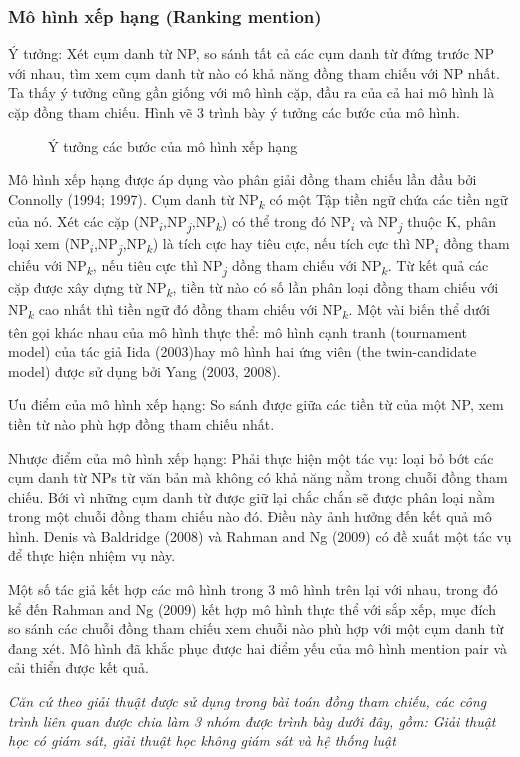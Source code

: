 \documentclass[12pt]{extarticle}
\begin{document}
			\subsubsection*{Mô hình xếp hạng (Ranking mention)}
				\par Ý tưởng: Xét cụm danh từ NP, so sánh tất cả các cụm danh từ đứng trước NP với nhau, tìm xem cụm danh từ nào có khả năng đồng tham chiếu với NP nhất. Ta thấy ý tưởng cũng gần giống với mô hình cặp, đầu ra của cả hai mô hình là cặp đồng tham chiếu. Hình vẽ 3 trình bày ý tưởng các bước của mô hình.
				\begin{figure}[H]
					\centering
					
					\caption{Ý tưởng các bước của mô hình xếp hạng}
				\end{figure}
				\par Mô hình xếp hạng được áp dụng vào phân giải đồng tham chiếu lần đầu bởi Connolly (1994; 1997)\cite{connolly95}\cite{connolly97}. Cụm danh từ NP\textsubscript{$k$} có một Tập tiền ngữ chứa các tiền ngữ của nó. Xét các cặp (NP\textsubscript{$i$},NP\textsubscript{$j$},NP\textsubscript{$k$}) có thể trong đó NP\textsubscript{$i$} và NP\textsubscript{$j$} thuộc K, phân loại xem (NP\textsubscript{$i$},NP\textsubscript{$j$},NP\textsubscript{$k$}) là tích cực hay tiêu cực, nếu tích cực thì NP\textsubscript{$i$} đồng tham chiếu với NP\textsubscript{$k$}, nếu tiêu cực thì NP\textsubscript{$j$} dồng tham chiếu với NP\textsubscript{$k$}. Từ kết quả các cặp được xây dựng từ NP\textsubscript{$k$}, tiền từ nào có số lần phân loại đồng tham chiếu với NP\textsubscript{$k$} cao nhất thì tiền ngữ đó đồng tham chiếu với NP\textsubscript{$k$}.
				Một vài biến thể dưới tên gọi khác nhau của mô hình thực thể: mô hình cạnh tranh (tournament model) của tác giả Iida (2003)\cite{iida03}hay mô hình hai ứng viên (the twin-candidate model) được sử dụng bởi Yang (2003, 2008)\cite{yang03}\cite{yang08}. 
				\par Ưu điểm của mô hình xếp hạng: So sánh được giữa các tiền từ của một NP, xem tiền từ nào phù hợp đồng tham chiếu nhất.
				\par Nhược điểm của mô hình xếp hạng: Phải thực hiện một tác vụ: loại bỏ bớt các cụm danh từ NPs từ văn bản mà không có khả năng nằm trong chuỗi đồng tham chiếu. Bới vì những cụm danh từ được giữ lại chắc chắn sẽ được phân loại nằm trong một chuỗi đồng tham chiếu nào đó. Điều này ảnh hưởng đến kết quả mô hình. Denis và Baldridge (2008)\cite{denis08} và Rahman and Ng (2009)\cite{rahman09} có đề xuất một tác vụ để thực hiện nhiệm vụ này.					
				\par Một số tác giả kết hợp các mô hình trong 3 mô hình trên lại với nhau, trong đó kể đến Rahman and Ng (2009)\cite{rahman09} kết hợp mô hình thực thể với sắp xếp, mục đích so sánh các chuỗi đồng tham chiếu xem chuỗi nào phù hợp với một cụm danh từ đang xét. Mô hình đã khắc phục được hai điểm yếu của mô hình mention pair và cải thiển được kết quả.
			\par \textit{Căn cứ theo giải thuật được sử dụng trong bài toán đồng tham chiếu, các công trình liên quan được chia làm 3 nhóm được trình bày dưới đây, gồm: Giải thuật học có giám sát, giải thuật học không giám sát và hệ thống luật}
\end{document}
